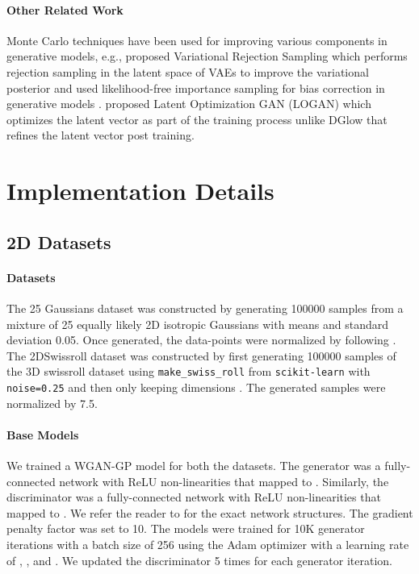 \documentclass{article} \usepackage{iclr2021_conference,times}
\newcommand{\ourmethod}{\textsc{DG}low}
\begin{document}
\paragraph{Other Related Work} Monte Carlo techniques have been used for improving various components in generative models, e.g., \citet{grover18variational} proposed Variational Rejection Sampling which performs rejection sampling in the latent space of VAEs to improve the variational posterior and \citet{grover2019bias} used likelihood-free importance sampling for bias correction in generative models . \citet{wu2020logan} proposed Latent Optimization GAN (LOGAN) which optimizes the latent vector as part of the training process unlike \ourmethod{} that refines the latent vector post training.


\section{Implementation Details}

\subsection{2D Datasets}

\paragraph{Datasets} The 25 Gaussians dataset was constructed by generating 100000 samples from a mixture of 25 equally likely 2D isotropic Gaussians with means  and standard deviation 0.05. Once generated, the data-points were normalized by  following \citet{tanaka2019discriminator}. The 2DSwissroll dataset was constructed by first generating 100000 samples of the 3D swissroll dataset using \texttt{make\_swiss\_roll} from \texttt{scikit-learn} with \texttt{noise=0.25} and then only keeping dimensions . The generated samples were normalized by 7.5. 

\paragraph{Base Models} We trained a WGAN-GP model for both the datasets. The generator was a fully-connected network with ReLU non-linearities that mapped  to . Similarly, the  discriminator was a fully-connected network with ReLU non-linearities that mapped  to . We refer the reader to \citet{gulrajani2017improved} for the exact network structures. The gradient penalty factor was set to 10. The models were trained for 10K generator iterations with a batch size of 256 using the Adam optimizer with a learning rate of , , and . We updated the discriminator 5 times for each generator iteration.
\end{document}

